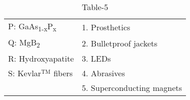 \begin{table}[htbp]
\centering
\caption{Table-5}
\label{tab:tables/table5.tex}

\begin{tabular}{l l}
P: GaAs\textsubscript{1-x}P\textsubscript{x} & 1. Prosthetics \\
Q: MgB\textsubscript{2} & 2. Bulletproof jackets \\
R: Hydroxyapatite & 3. LEDs \\
S: Kevlar$^\mathrm{TM}$ fibers & 4. Abrasives \\
& 5. Superconducting magnets \\
\end{tabular}

\end{table}
